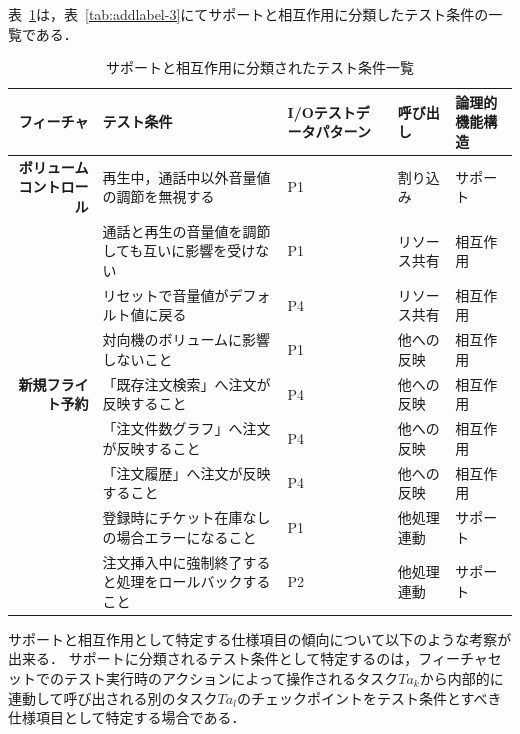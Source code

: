 表~\ref{tab:D-4-SandI}は，表~\ref{tab:addlabel-3}にてサポートと相互作用に分類したテスト条件の一覧である．

\begin{table}[htbp]
  \centering
  \caption{サポートと相互作用に分類されたテスト条件一覧}
    \begin{tabular}{|r|p{8em}|p{4em}|p{4em}|p{5em}|}
    \hline
    \multicolumn{1}{|p{4em}|}{\textbf{フィーチャ}} & \textbf{テスト条件} & \textbf{I/Oテストデータパターン} & \textbf{呼び出し} & \textbf{論理的機能構造} \bigstrut\\
    \hline
    \multicolumn{1}{|p{4em}|}{\textbf{ボリュームコントロール}} & 再生中，通話中以外音量値の調節を無視する & P1　   & 割り込み  & サポート \bigstrut\\
\cline{2-5}          & 通話と再生の音量値を調節しても互いに影響を受けない & P1    & リソース共有 & 相互作用 \bigstrut\\
\cline{2-5}          & リセットで音量値がデフォルト値に戻る & P4　　  & リソース共有 & 相互作用 \bigstrut\\
    \cline{2-5}          & 対向機のボリュームに影響しないこと & P1　　  &  他への反映 & 相互作用 \bigstrut\\
    \hline
    \multicolumn{1}{|p{4em}|}{\textbf{新規フライト予約}} & 「既存注文検索」へ注文が反映すること & P4　   & 他への反映 & 相互作用 \bigstrut\\
\cline{2-5}          & 「注文件数グラフ」へ注文が反映すること & P4　   & 他への反映 & 相互作用 \bigstrut\\
\cline{2-5}          & 「注文履歴」へ注文が反映すること & P4    & 他への反映 & 相互作用 \bigstrut\\
\cline{2-5}          & 登録時にチケット在庫なしの場合エラーになること & P1    & 他処理連動 & サポート \bigstrut\\
\cline{2-5}          & 注文挿入中に強制終了すると処理をロールバックすること & P2    & 他処理連動 & サポート \bigstrut\\
    \hline
    \end{tabular}%
  \label{tab:D-4-SandI}%
\end{table}%

サポートと相互作用として特定する仕様項目の傾向について以下のような考察が出来る．
サポートに分類されるテスト条件として特定するのは，フィーチャセットでのテスト実行時のアクションによって操作されるタスク$Ta_k$から内部的に連動して呼び出される別のタスク$Ta_l$のチェックポイントをテスト条件とすべき仕様項目として特定する場合である．

